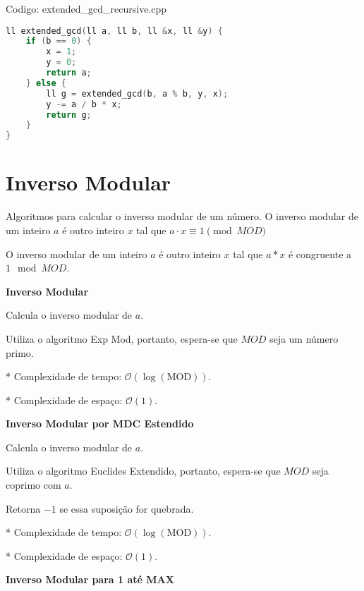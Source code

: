 \documentclass[10pt, a4paper, oneside]{book}
\begin{document}
Codigo: extended\_gcd\_recursive.cpp

\begin{lstlisting}[language=C++]
ll extended_gcd(ll a, ll b, ll &x, ll &y) {
    if (b == 0) {
        x = 1;
        y = 0;
        return a;
    } else {
        ll g = extended_gcd(b, a % b, y, x);
        y -= a / b * x;
        return g;
    }
}
\end{lstlisting}
\hfill

\section{Inverso Modular}


Algoritmos para calcular o inverso modular de um número. O inverso modular de um inteiro $a$ é outro inteiro $x$ tal que $a \cdot x \equiv 1 \pmod{MOD}$



O inverso modular de um inteiro $a$ é outro inteiro $x$ tal que $a * x$ é congruente a $1 \mod MOD$.



\textbf{Inverso Modular} 



Calcula o inverso modular de $a$.



Utiliza o algoritmo Exp Mod, portanto, espera-se que $MOD$ seja um número primo.



* Complexidade de tempo: $\mathcal{O}(\log(\text{MOD}))$.

* Complexidade de espaço: $\mathcal{O}(1)$.



\textbf{Inverso Modular por MDC Estendido} 



Calcula o inverso modular de $a$.



Utiliza o algoritmo Euclides Extendido, portanto, espera-se que $MOD$ seja coprimo com $a$.



Retorna $-1$ se essa suposição for quebrada.



* Complexidade de tempo: $\mathcal{O}(\log(\text{MOD}))$.

* Complexidade de espaço: $\mathcal{O}(1)$.



\textbf{Inverso Modular para 1 até MAX} 
\end{document}
